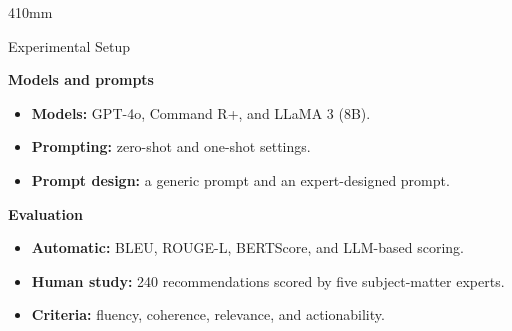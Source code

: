 \documentclass{article}
\newcommand{\SectionHeading}[1]{{\bfseries\fontsize{29}{33}\selectfont #1}\par\vspace{4mm}}
\newcommand{\BodyText}{\fontsize{24}{30}\selectfont\color{PosterText}}
\begin{document}
\begin{textblock*}{410mm}
\vspace{8mm}
\begin{postersection}{Experimental Setup}
\BodyText
\begin{minipage}[t]{0.48\linewidth}
\SectionHeading{Models and prompts}
\begin{itemize}[leftmargin=9mm,itemsep=3mm,topsep=1mm]
  \item \textbf{Models:} GPT-4o, Command R+, and LLaMA 3 (8B).
  \item \textbf{Prompting:} zero-shot and one-shot settings.
  \item \textbf{Prompt design:} a generic prompt and an expert-designed prompt.
\end{itemize}
\end{minipage}\hfill
\begin{minipage}[t]{0.48\linewidth}
\SectionHeading{Evaluation}
\begin{itemize}[leftmargin=9mm,itemsep=3mm,topsep=1mm]
  \item \textbf{Automatic:} BLEU, ROUGE-L, BERTScore, and LLM-based scoring.
  \item \textbf{Human study:} 240 recommendations scored by five subject-matter experts.
  \item \textbf{Criteria:} fluency, coherence, relevance, and actionability.
\end{itemize}
\end{minipage}
\end{postersection}
\end{textblock*}
\end{document}

